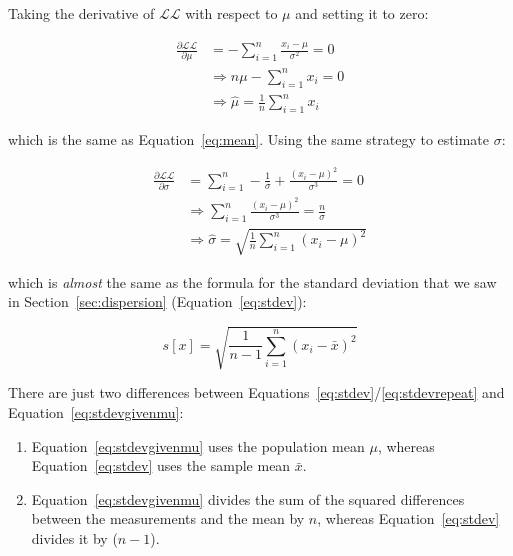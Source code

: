 Taking the derivative of $\mathcal{LL}$ with respect to $\mu$ and
setting it to zero:

\begin{equation}
  \begin{split}
    \frac{\partial{\mathcal{LL}}}{\partial{\mu}} & =
    - \sum\limits_{i=1}^{n} \frac{x_i-\mu}{\sigma^2} = 0 \\
    & \Rightarrow n\mu - \sum\limits_{i=1}^{n} x_i = 0 \\
    & \Rightarrow \hat{\mu} = \frac{1}{n}\sum\limits_{i=1}^{n}x_i
  \end{split}
\end{equation}

\noindent which is the same as Equation~\ref{eq:mean}. Using the same
strategy to estimate $\sigma$:

\begin{equation}
  \begin{split}
    \frac{\partial{\mathcal{LL}}}{\partial{\sigma}} & =
    \sum\limits_{i=1}^{n} - \frac{1}{\sigma} +  \frac{(x_i-\mu)^2}{\sigma^3} = 0\\
    & \Rightarrow  \sum\limits_{i=1}^{n} \frac{(x_i-\mu)^2}{\sigma^3} = \frac{n}{\sigma} \\
    & \Rightarrow \hat{\sigma} = \sqrt{\frac{1}{n}\sum\limits_{i=1}^{n}(x_i-\mu)^2}
  \end{split}
  \label{eq:stdevgivenmu}
\end{equation}

\noindent which is \emph{almost} the same as the formula for the
standard deviation that we saw in Section~\ref{sec:dispersion}
(Equation~\ref{eq:stdev}):

\begin{equation}
  s[x] = \sqrt{\frac{1}{n-1}\sum\limits_{i=1}^{n}(x_i-\bar{x})^2}
  \label{eq:stdevrepeat}
\end{equation}

There are just two differences between
Equations~\ref{eq:stdev}/\ref{eq:stdevrepeat} and
Equation~\ref{eq:stdevgivenmu}:

\begin{enumerate}
\item Equation~\ref{eq:stdevgivenmu} uses the population mean $\mu$,
  whereas Equation~\ref{eq:stdev} uses the sample mean $\bar{x}$.
\item Equation~\ref{eq:stdevgivenmu} divides the sum of the squared
  differences between the measurements and the mean by $n$, whereas
  Equation~\ref{eq:stdev} divides it by ($n-1$).
\end{enumerate}

